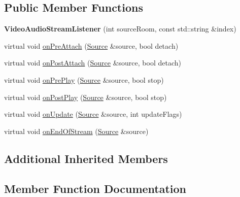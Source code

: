 \subsection*{Public Member Functions}
\begin{DoxyCompactItemize}
\item 
{\bfseries Video\+Audio\+Stream\+Listener} (int source\+Room, const std\+::string \&index)\hypertarget{classBaseUtil_1_1VideoAudioStreamListener_a0a83cc0718b211b997bd5f4829e0838f}{}\label{classBaseUtil_1_1VideoAudioStreamListener_a0a83cc0718b211b997bd5f4829e0838f}

\item 
virtual void \hyperlink{classBaseUtil_1_1VideoAudioStreamListener_a053885b191373752a7760e686da9a64b}{on\+Pre\+Attach} (\hyperlink{classAudio_1_1Source}{Source} \&source, bool detach)
\item 
virtual void \hyperlink{classBaseUtil_1_1VideoAudioStreamListener_a66f5b49ee9f5a500d7d5e098251d1e33}{on\+Post\+Attach} (\hyperlink{classAudio_1_1Source}{Source} \&source, bool detach)
\item 
virtual void \hyperlink{classBaseUtil_1_1VideoAudioStreamListener_a69c69dad651eba90ed046df8abc7264e}{on\+Pre\+Play} (\hyperlink{classAudio_1_1Source}{Source} \&source, bool stop)
\item 
virtual void \hyperlink{classBaseUtil_1_1VideoAudioStreamListener_ad2f808b2475748a696e7a6fa4d711fdf}{on\+Post\+Play} (\hyperlink{classAudio_1_1Source}{Source} \&source, bool stop)
\item 
virtual void \hyperlink{classBaseUtil_1_1VideoAudioStreamListener_a9dc1b41e59e3113cb1d4e224347f5e7d}{on\+Update} (\hyperlink{classAudio_1_1Source}{Source} \&source, int update\+Flags)
\item 
virtual void \hyperlink{classBaseUtil_1_1VideoAudioStreamListener_a7f47963e328376543d5af3cd7fa7de19}{on\+End\+Of\+Stream} (\hyperlink{classAudio_1_1Source}{Source} \&source)
\end{DoxyCompactItemize}
\subsection*{Additional Inherited Members}


\subsection{Member Function Documentation}

